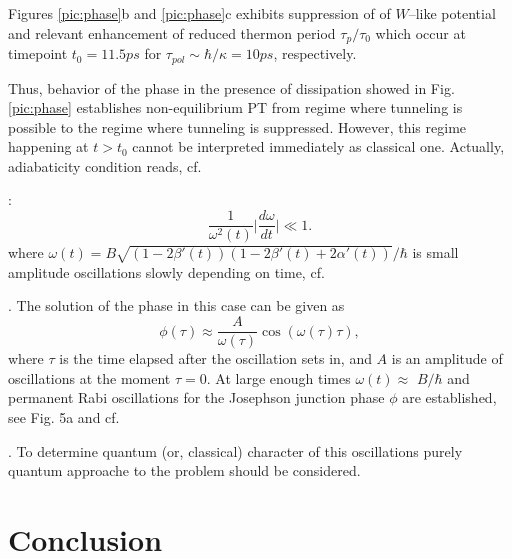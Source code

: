 \documentclass[aps, pre, preprint, groupedaddress, superscriptaddress, showkeys, showpacs] {revtex4-1}
\begin{document}
Figures \ref{pic:phase}b and \ref{pic:phase}c  exhibits suppression of of $W$--like potential and relevant enhancement of reduced thermon period $\tau_{p} / \tau_0$ which occur  at timepoint $t_0 = 11.5 ps$ for  $\tau_{pol} \sim \hbar/\kappa= 10 ps$, respectively. 

Thus, behavior of the phase in the presence of dissipation showed in Fig. \ref{pic:phase} establishes non-equilibrium PT from regime where tunneling is possible to the regime where tunneling is suppressed. However, this regime happening at $t>t_0$ cannot be interpreted immediately as classical one.
Actually, adiabaticity condition reads, cf. {\cite{Sols}:
%
\begin{equation}
\dfrac{1}{\omega^2(t)} \Big| \dfrac{d \omega}{d t} \Big| \ll 1.
\end{equation}
%
where $\omega(t) = B \sqrt{(1 - 2 \beta'(t))(1 - 2 \beta'(t) + 2 \alpha'(t))}/ \hbar $ is small amplitude oscillations slowly depending on time, cf. {\cite{Sedov}. 
%
%
The solution of the phase in this case can be given as 
\begin{equation}
\phi(\tau) \approx \dfrac{A}{\omega(\tau)} \cos (\omega(\tau) \tau),
\end{equation}
%
where $\tau$ is the time elapsed after the oscillation sets in, and $A$ is an amplitude of oscillations at the moment $\tau = 0$. At large enough times 
$\omega(t) \approx$ $B/ \hbar $  and permanent Rabi  oscillations for the Josephson junction phase $\phi$ are established, see Fig. 5a and cf.{\cite{Permamemt}.  To determine quantum (or, classical) character of this oscillations purely quantum approache to the problem should be considered.      


\section{Conclusion \label{sec:conclusion}}

}}}
\end{document}
